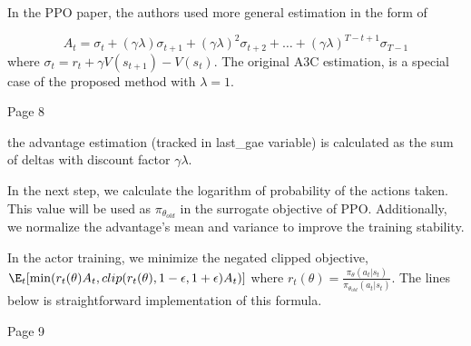 In the PPO paper, the authors used more general estimation in the form of

\begin{equation*}
  A_t= \sigma_t+(\gamma\lambda)\sigma_{t+1}+(\gamma\lambda)^2\sigma_{t+2}+\ldots+(\gamma\lambda)^{T-t+1}\sigma_{T-1}
\end{equation*}
where \begin{math}\sigma_t=r_t+\gamma V(s_{t+1})-V(s_t)\end{math}. The original
A3C estimation, is a special case of the proposed method with \begin{math}\lambda=1\end{math}.

Page 8

the advantage estimation (tracked in last\_gae variable) is calculated as the sum of deltas with discount
factor \begin{math}\gamma\lambda\end{math}.

In the next step, we calculate the logarithm of probability of the actions taken. This value will be used as
\begin{math}\pi_{\theta_{old}}\end{math} in the surrogate objective of PPO. Additionally, we normalize the advantage’s
mean and variance to improve the training stability.

In the actor training, we minimize the negated clipped objective,
\begin{math}\E_t[\min(r_t(\theta)A_t,clip(r_t(\theta), 1-\epsilon, 1+\epsilon)A_t)]\end{math}
where
\begin{math}r_t(\theta)=\frac{\pi_\theta(a_t|s_t)}{\pi_{\theta_{old}}(a_t|s_t)}\end{math}.
The lines below is straightforward implementation of this formula.

Page 9

